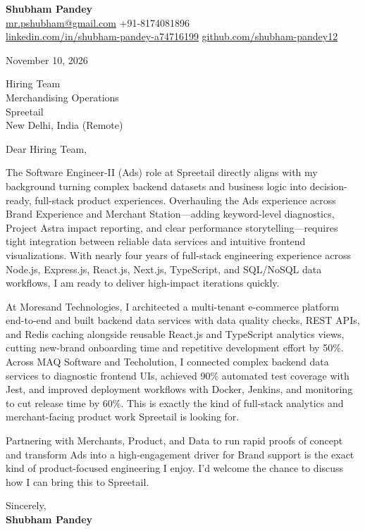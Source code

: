 \documentclass[a4paper,11pt]{article}
\begin{document}
\textbf{\Large Shubham Pandey}\\
\href{mailto:mr.pshubham@gmail.com}{mr.pshubham@gmail.com} \quad +91-8174081896\\
\href{https://www.linkedin.com/in/shubham-pandey-a74716199/}{linkedin.com/in/shubham-pandey-a74716199} \quad
\href{https://github.com/shubham-pandey12}{github.com/shubham-pandey12}

\vspace{1em}
November 10, 2026

\vspace{1em}
Hiring Team\\
Merchandising Operations\\
Spreetail\\
New Delhi, India (Remote)

\vspace{1em}
Dear Hiring Team,

The Software Engineer-II (Ads) role at Spreetail directly aligns with my background turning complex backend datasets and business logic into decision-ready, full-stack product experiences. Overhauling the Ads experience across Brand Experience and Merchant Station---adding keyword-level diagnostics, Project Astra impact reporting, and clear performance storytelling---requires tight integration between reliable data services and intuitive frontend visualizations. With nearly four years of full-stack engineering experience across Node.js, Express.js, React.js, Next.js, TypeScript, and SQL/NoSQL data workflows, I am ready to deliver high-impact iterations quickly.

At Moresand Technologies, I architected a multi-tenant e-commerce platform end-to-end and built backend data services with data quality checks, REST APIs, and Redis caching alongside reusable React.js and TypeScript analytics views, cutting new-brand onboarding time and repetitive development effort by 50\%. Across MAQ Software and Techolution, I connected complex backend data services to diagnostic frontend UIs, achieved 90\% automated test coverage with Jest, and improved deployment workflows with Docker, Jenkins, and monitoring to cut release time by 60\%. This is exactly the kind of full-stack analytics and merchant-facing product work Spreetail is looking for.

Partnering with Merchants, Product, and Data to run rapid proofs of concept and transform Ads into a high-engagement driver for Brand support is the exact kind of product-focused engineering I enjoy. I'd welcome the chance to discuss how I can bring this to Spreetail.

\vspace{1em}
Sincerely,\\[0.5em]
\textbf{Shubham Pandey}
\end{document}
